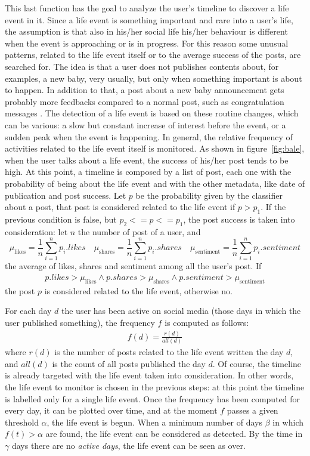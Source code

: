 This last function has the goal to analyze the user's timeline to discover a life event in it. Since a life event is something important and rare into a user's life, the assumption is that also in his/her social life his/her behaviour is different when the event is approaching or is in progress. For this reason some unusual patterns, related to the life event itself or to the average success of the posts, are searched for. The idea is that a user does not publishes contents about, for examples, a new baby, very usually, but only when something important is about to happen. In addition to that, a post about a new baby announcement gets probably more feedbacks compared to a normal post, such as congratulation messages \cite{dickinson2015identifying}. The detection of a life event is based on these routine changes, which can be various: a slow but constant increase of interest before the event, or a sudden peak when the event is happening. In general, the relative frequency of activities related to the life event itself is monitored. As shown in figure~\ref{fig:bale}, when the user talks about a life event, the success of his/her post tends to be high.
At this point, a timeline is composed by a list of post, each one with the probability of being about the life event and with the other metadata, like date of publication and post success. Let $p$ be the probability given by the classifier about a post, that post is considered related to the life event if $ p > p_1$. If the previous condition is false, but $p_2 <= p <= p_1 $, the post success is taken into consideration: let $n$ the number of post of a user, and
\[
\mu_\text{likes} = \frac{1}{n} \sum_{i=1}^n p_i.likes \quad \mu_\text{shares} = \frac{1}{n} \sum_{i=1}^n p_i.shares \quad \mu_\text{sentiment} = \frac{1}{n} \sum_{i=1}^n p_i.sentiment
\]
the average of likes, shares and sentiment among all the user's post. If 
\begin{gather}
\label{avgs}
p.likes > \mu_\text{likes} \land p.shares > \mu_\text{shares} \land p.sentiment > \mu_\text{sentiment}
\end{gather}
the post $p$ is considered related to the life event, otherwise no.

For each day $d$ the user has been active on social media (those days in which the user published something), the frequency $f$ is computed as follows:
\begin{gather}
f(d) = \frac{r(d)}{all(d)}
\label{freq}
\end{gather}
where $r(d)$ is the number of posts related to the life event written the day $d$, and $all(d)$ is the count of all posts published the day $d$. Of course, the timeline is already targeted with the life event taken into consideration. In other words, the life event to monitor is chosen in the previous steps: at this point the timeline is labelled only for a single life event. Once the frequency has been computed for every day, it can be plotted over time, and at the moment $f$ passes a given threshold $\alpha$, the life event is begun. When a minimum number of days $\beta$ in which $f(t) > \alpha$ are found, the life event can be considered as detected. By the time in $\gamma$ days there are no \textit{active days}, the life event can be seen as over.

